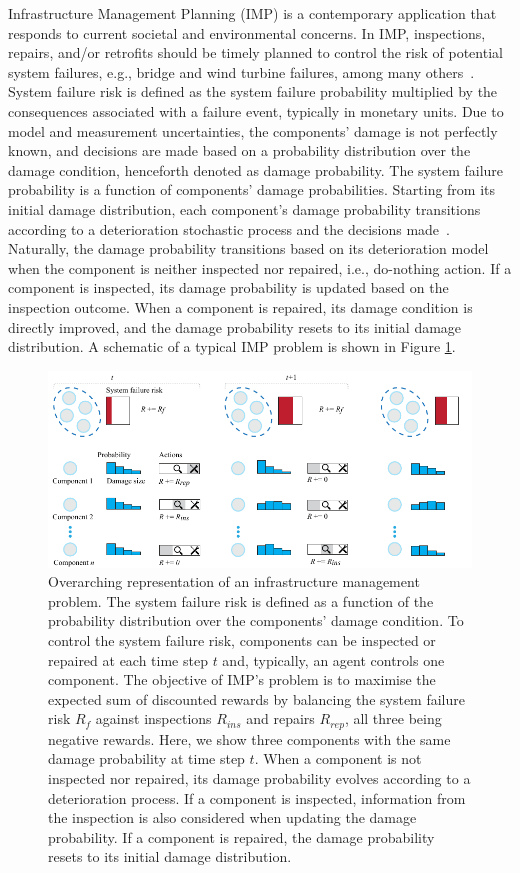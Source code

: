 Infrastructure Management Planning (IMP) is a contemporary application that responds to current societal and environmental concerns.
In IMP, inspections, repairs, and/or retrofits should be timely planned to control the risk of potential system failures, e.g., bridge and wind turbine failures, among many others~\citep{morato2022optimal}.
System failure risk is defined as the system failure probability multiplied by the consequences associated with a failure event, typically in monetary units.
Due to model and measurement uncertainties, the components' damage is not perfectly known, and decisions are made based on a probability distribution over the damage condition, henceforth denoted as damage probability.
The system failure probability is a function of components' damage probabilities.
Starting from its initial damage distribution, each component's damage probability transitions according to a deterioration stochastic process and the decisions made~\citep{morato2022optimal}.
Naturally, the damage probability transitions based on its deterioration model when the component is neither inspected nor repaired, i.e., do-nothing action.
If a component is inspected, its damage probability is updated based on the inspection outcome.
When a component is repaired, its damage condition is directly improved, and the damage probability resets to its initial damage distribution.
A schematic of a typical IMP problem is shown in Figure \ref{fig:ch5_imp_problem}.

\begin{figure}
\centering
\includegraphics[width=\textwidth]{tex_thesis/figures/ch5/imp_intro.pdf}
\caption{Overarching representation of an infrastructure management problem.
The system failure risk is defined as a function of the probability distribution over the components' damage condition. 
To control the system failure risk, components can be inspected or repaired at each time step $t$ and, typically, an agent controls one component.
The objective of IMP's problem is to maximise the expected sum of discounted rewards by balancing the system failure risk $R_f$ against inspections $R_{ins}$ and repairs $R_{rep}$, all three being negative rewards.
Here, we show three components with the same damage probability at time step $t$.
When a component is not inspected nor repaired, its damage probability evolves according to a deterioration process.
If a component is inspected, information from the inspection is also considered when updating the damage probability.
If a component is repaired, the damage probability resets to its initial damage distribution.}
\label{fig:ch5_imp_problem}
\end{figure}

